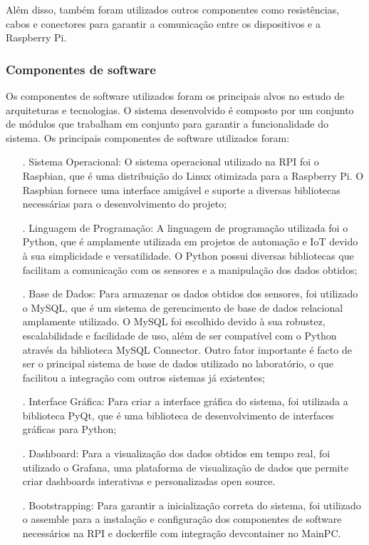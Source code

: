 Além disso, também foram utilizados outros componentes como resistências, cabos e conectores para garantir
a comunicação entre os dispositivos e a Raspberry Pi.

\subsubsection{Componentes de software}

Os componentes de software utilizados foram os principais alvos no estudo de arquiteturas e tecnologias. O sistema desenvolvido é composto por um conjunto 
de módulos que trabalham em conjunto para garantir a funcionalidade do sistema. Os principais componentes de software utilizados foram: 
\begin{itemize}
    \item[.] Sistema Operacional: O sistema operacional utilizado na RPI foi o Raspbian, 
    que é uma distribuição do Linux otimizada para a Raspberry Pi. O Raspbian fornece 
    uma interface amigável e suporte a diversas bibliotecas necessárias para o 
    desenvolvimento do projeto;
    \item[.] Linguagem de Programação: A linguagem de programação utilizada foi o Python, 
    que é amplamente utilizada em projetos de automação e IoT devido à sua simplicidade 
    e versatilidade. O Python possui diversas bibliotecas que facilitam a comunicação 
    com os sensores e a manipulação dos dados obtidos;
    \item[.] Base de Dados: Para armazenar os dados obtidos dos sensores, foi utilizado 
    o MySQL, que é um sistema de gerencimento de base de dados relacional amplamente
    utilizado. O MySQL foi escolhido devido à sua robustez, escalabilidade e facilidade de uso,
    além de ser compatível com o Python através da biblioteca MySQL Connector. Outro fator
    importante é facto de ser o principal sistema de base de dados utilizado no laboratório,
    o que facilitou a integração com outros sistemas já existentes;
    \item[.] Interface Gráfica: Para criar a interface gráfica do sistema, foi utilizada a 
    biblioteca PyQt, que é uma biblioteca de desenvolvimento de interfaces gráficas para Python;
    \item[.] Dashboard: Para a visualização dos dados obtidos em tempo real, foi utilizado o Grafana,
    uma plataforma de visualização de dados que permite criar dashboards interativas e personalizadas open source.
    \item[.] Bootstrapping: Para garantir a inicialização correta do sistema, foi utilizado o
    assemble para a instalação e configuração dos componentes de software necessários na RPI e dockerfile
    com integração devcontainer no MainPC.
\end{itemize}

